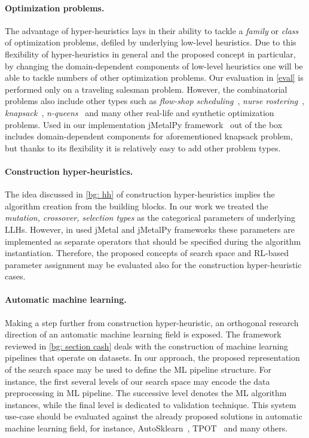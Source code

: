 \paragraph{Optimization problems.} The advantage of hyper-heuristics lays in their ability to tackle a \emph{family} or \emph{class} of optimization problems, defiled by underlying low-level heuristics. Due to this flexibility of hyper-heuristics in general and the proposed concept in particular, by changing the domain-dependent components of low-level heuristics one will be able to tackle numbers of other optimization problems. Our evaluation in \cref{eval} is performed only on a traveling salesman problem. However, the combinatorial problems also include other types such as \emph{flow-shop scheduling}~\cite{gupta2006flowshop}, \emph{nurse rostering}~\cite{cheang2003nurse}, \emph{knapsack}~\cite{ross1989stochastic}, \emph{n-queens}~\cite{rivin1994n} and many other real-life and synthetic optimization problems. Used in our implementation jMetalPy framework~\cite{benitez2019jmetalpy} out of the box includes domain-dependent components for aforementioned knapsack problem, but thanks to its flexibility it is relatively easy to add other problem types.

\paragraph{Construction hyper-heuristics.} The idea discussed in \cref{bg: hh} of construction hyper-heuristics implies the algorithm creation from the building blocks. In our work we treated the \emph{mutation, crossover, selection types} as the categorical parameters of underlying LLHs. However, in used jMetal and jMetalPy frameworks these parameters are implemented as separate operators that should be specified during the algorithm instantiation. Therefore, the proposed concepts of search space and RL-based parameter assignment may be evaluated also for the construction hyper-heuristic cases.

\paragraph{Automatic machine learning.} Making a step further from construction hyper-heuristic, an orthogonal research direction of an automatic machine learning field is exposed. The framework reviewed in \cref{bg: section cash} deals with the construction of machine learning pipelines that operate on datasets. In our approach, the proposed representation of the search space may be used to define the ML pipeline structure. For instance, the first several levels of our search space may encode the data preprocessing in ML pipeline. The successive level denotes the ML algorithm instances, while the final level is dedicated to validation technique. This system use-case should be evaluated against the already proposed solutions in automatic machine learning field, for instance, AutoSklearn~\cite{feurer2015efficient}, TPOT~\cite{olson2019tpot} and many others.


